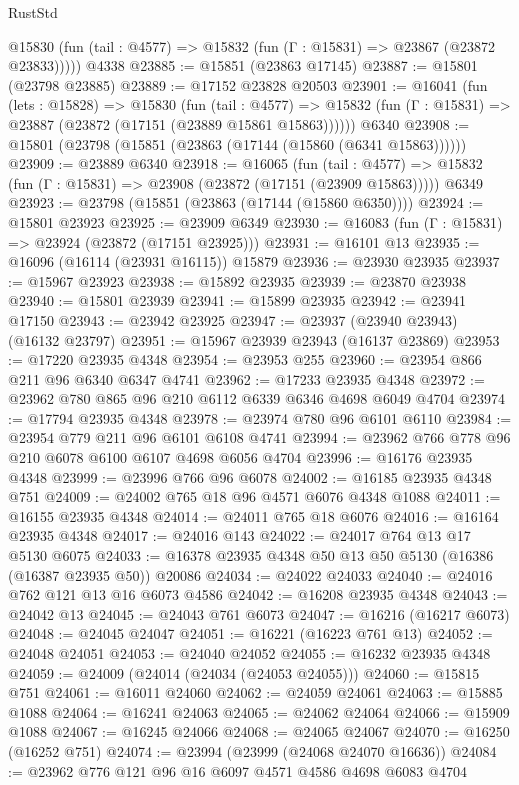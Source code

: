 \begin{lexlean}{RustStd}
\begin{coremodule}
      @15830 (fun (tail : @4577) => @15832 (fun (Γ : @15831) => @23867 (@23872 @23833)))))
    @4338
@23885 := @15851 (@23863 @17145)
@23887 := @15801 (@23798 @23885)
@23889 := @17152 @23828 @20503
@23901 := @16041
    (fun (lets : @15828) =>
    @15830
      (fun (tail : @4577) =>
      @15832 (fun (Γ : @15831) => @23887 (@23872 (@17151 (@23889 @15861 @15863))))))
    @6340
@23908 := @15801 (@23798 (@15851 (@23863 (@17144 (@15860 (@6341 @15863))))))
@23909 := @23889 @6340
@23918 := @16065
    (fun (tail : @4577) => @15832 (fun (Γ : @15831) => @23908 (@23872 (@17151 (@23909 @15863)))))
    @6349
@23923 := @23798 (@15851 (@23863 (@17144 (@15860 @6350))))
@23924 := @15801 @23923
@23925 := @23909 @6349
@23930 := @16083 (fun (Γ : @15831) => @23924 (@23872 (@17151 @23925)))
@23931 := @16101 @13
@23935 := @16096 (@16114 (@23931 @16115)) @15879
@23936 := @23930 @23935
@23937 := @15967 @23923
@23938 := @15892 @23935
@23939 := @23870 @23938
@23940 := @15801 @23939
@23941 := @15899 @23935
@23942 := @23941 @17150
@23943 := @23942 @23925
@23947 := @23937 (@23940 @23943) (@16132 @23797)
@23951 := @15967 @23939 @23943 (@16137 @23869)
@23953 := @17220 @23935 @4348
@23954 := @23953 @255
@23960 := @23954 @866 @211 @96 @6340 @6347 @4741
@23962 := @17233 @23935 @4348
@23972 := @23962 @780 @865 @96 @210 @6112 @6339 @6346 @4698 @6049 @4704
@23974 := @17794 @23935 @4348
@23978 := @23974 @780 @96 @6101 @6110
@23984 := @23954 @779 @211 @96 @6101 @6108 @4741
@23994 := @23962 @766 @778 @96 @210 @6078 @6100 @6107 @4698 @6056 @4704
@23996 := @16176 @23935 @4348
@23999 := @23996 @766 @96 @6078
@24002 := @16185 @23935 @4348 @751
@24009 := @24002 @765 @18 @96 @4571 @6076 @4348 @1088
@24011 := @16155 @23935 @4348
@24014 := @24011 @765 @18 @6076
@24016 := @16164 @23935 @4348
@24017 := @24016 @143
@24022 := @24017 @764 @13 @17 @5130 @6075
@24033 := @16378 @23935 @4348 @50 @13 @50 @5130 (@16386 (@16387 @23935 @50)) @20086
@24034 := @24022 @24033
@24040 := @24016 @762 @121 @13 @16 @6073 @4586
@24042 := @16208 @23935 @4348
@24043 := @24042 @13
@24045 := @24043 @761 @6073
@24047 := @16216 (@16217 @6073)
@24048 := @24045 @24047
@24051 := @16221 (@16223 @761 @13)
@24052 := @24048 @24051
@24053 := @24040 @24052
@24055 := @16232 @23935 @4348
@24059 := @24009 (@24014 (@24034 (@24053 @24055)))
@24060 := @15815 @751
@24061 := @16011 @24060
@24062 := @24059 @24061
@24063 := @15885 @1088
@24064 := @16241 @24063
@24065 := @24062 @24064
@24066 := @15909 @1088
@24067 := @16245 @24066
@24068 := @24065 @24067
@24070 := @16250 (@16252 @751)
@24074 := @23994 (@23999 (@24068 @24070 @16636))
@24084 := @23962 @776 @121 @96 @16 @6097 @4571 @4586 @4698 @6083 @4704

\end{coremodule}
\end{lexlean}
